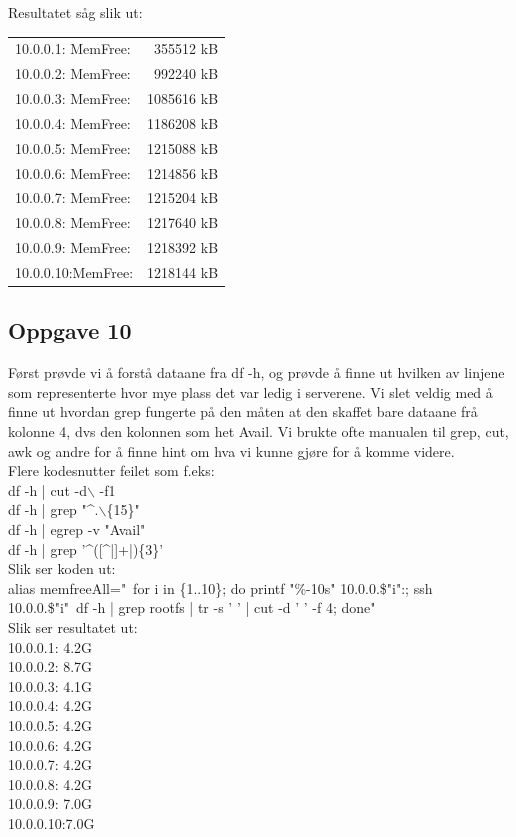 \documentclass[a4paper, norsk, 12pt]{article}
\begin{document}
Resultatet såg slik ut:\\
\begin{tabular}{lr}
10.0.0.1: MemFree: &         355512 kB\\
10.0.0.2: MemFree: &         992240 kB\\
10.0.0.3: MemFree: &        1085616 kB\\
10.0.0.4: MemFree: &        1186208 kB\\
10.0.0.5: MemFree: &        1215088 kB\\
10.0.0.6: MemFree: &        1214856 kB\\
10.0.0.7: MemFree: &        1215204 kB\\
10.0.0.8: MemFree: &        1217640 kB\\
10.0.0.9: MemFree: &        1218392 kB\\
10.0.0.10:MemFree: &        1218144 kB
\end{tabular}

\subsection{Oppgave 10}
Først prøvde vi å forstå dataane fra df -h, og prøvde å finne ut hvilken av linjene som representerte hvor mye plass det var ledig i serverene. Vi slet veldig med å finne ut hvordan grep fungerte på den måten at den skaffet bare dataane frå kolonne 4, dvs den kolonnen som het Avail. Vi brukte ofte manualen til grep, cut, awk og andre for å finne hint om hva vi kunne gjøre for å komme videre.\\

Flere kodesnutter feilet som f.eks:\\
df -h | cut -d$\backslash$  -f1\\
df -h | grep "\^{}.$\backslash$\{15\}"\\
df -h | egrep -v "Avail"\\
df -h | grep '\^{}([\^{}|]+|)\{3\}'\\

Slik ser koden ut:\\
alias memfreeAll="\ for i in \{1..10\}; do printf "\%-10s" 10.0.0.\$"i":; ssh 10.0.0.\$"i"\ df -h | grep rootfs | tr -s ' ' | cut -d ' ' -f 4; done"\\

Slik ser resultatet ut:\\
10.0.0.1: 4.2G\\
10.0.0.2: 8.7G\\
10.0.0.3: 4.1G\\
10.0.0.4: 4.2G\\
10.0.0.5: 4.2G\\
10.0.0.6: 4.2G\\
10.0.0.7: 4.2G\\
10.0.0.8: 4.2G\\
10.0.0.9: 7.0G\\
10.0.0.10:7.0G
\end{document}
